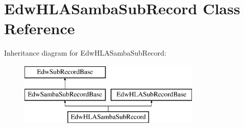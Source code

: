 \hypertarget{class_edw_h_l_a_samba_sub_record}{
\section{EdwHLASambaSubRecord Class Reference}
\label{class_edw_h_l_a_samba_sub_record}
}
Inheritance diagram for EdwHLASambaSubRecord:\begin{figure}[H]
\begin{center}
\leavevmode
\includegraphics[height=3cm]{class_edw_h_l_a_samba_sub_record}
\end{center}
\end{figure}
